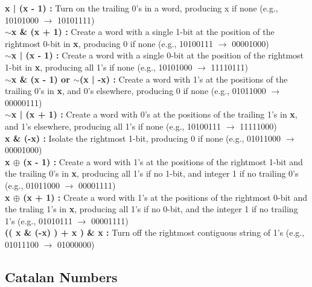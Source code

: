 \documentclass[10pt, twocolumn]{article}
\begin{document}
\begin{flushleft}
\textbf{x | (x - 1) :} Turn on the trailing 0's in a word, producing x if none (e.g., 10101000 $\rightarrow$ 10101111)\\[0.2cm]

\textbf{$\sim$x \& (x + 1) :} Create a word with a single 1-bit at the position of the rightmost 0-bit in \textbf{x}, producing 0 if none (e.g., 10100111 $\rightarrow$ 00001000)\\[0.2cm]

\textbf{$\sim$x | (x - 1) :} Create a word with a single 0-bit at the position of the rightmost 1-bit in \textbf{x}, producing all 1's if none (e.g., 10101000 $\rightarrow$ 11110111)\\[0.2cm]

\textbf{$\sim$x \& (x - 1)   or   $\sim$(x | -x) :} Create a word with 1's at the positions of the trailing 0's in \textbf{x}, and 0's elsewhere, producing 0 if none (e.g., 01011000 $\rightarrow$ 00000111)\\[0.2cm]

\textbf{$\sim$x | (x + 1) :} Create a word with 0's at the positions of the trailing 1's in \textbf{x}, and 1's elsewhere, producing all 1's if none (e.g., 10100111 $\rightarrow$ 11111000)\\[0.2cm]

\textbf{x \& (-x) :} Isolate the rightmost 1-bit, producing 0 if none (e.g., 01011000 $\rightarrow$ 00001000)\\[0.2cm]

\textbf{x $\oplus$ (x - 1) :} Create a word with 1's at the positions of the rightmost 1-bit and the trailing 0's in \textbf{x}, producing all 1's if no 1-bit, and integer 1 if no trailing 0's (e.g., 01011000 $\rightarrow$ 00001111)\\[0.2cm]

\textbf{x $\oplus$ (x + 1) :} Create a word with 1's at the positions of the rightmost 0-bit and the traling 1's in \textbf{x}, producing all 1's if no 0-bit, and the integer 1 if no trailing 1's (e.g., 01010111 $\rightarrow$ 00001111)\\[0.2cm]

\textbf{(( x \& (-x) ) + x ) \& x :} Turn off the rightmost contiguous string of 1's (e.g., 01011100 $\rightarrow$ 01000000)\\[0.2cm]

\subsection{Catalan Numbers}


\end{flushleft}
\end{document}
